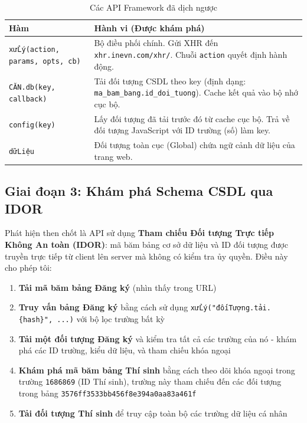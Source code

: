 \documentclass[12pt,a4paper]{article}
\begin{document}
\begin{table}[H]
\centering
\caption{Các API Framework đã dịch ngược}
\begin{tabular}{@{}lp{9cm}@{}}
\toprule
\textbf{Hàm} & \textbf{Hành vi (Được khám phá)} \\
\midrule
\texttt{xửLý(action, params, opts, cb)} &
    Bộ điều phối chính. Gửi XHR đến \texttt{xhr.inevn.com/xhr/}. Chuỗi \texttt{action} quyết định hành động. \\
\texttt{CĂN.db(key, callback)} &
    Tải đối tượng CSDL theo key (định dạng: \texttt{ma\_bam\_bang.id\_doi\_tuong}). Cache kết quả vào bộ nhớ cục bộ. \\
\texttt{config(key)} &
    Lấy đối tượng đã tải trước đó từ cache cục bộ. Trả về đối tượng JavaScript với ID trường (số) làm key. \\
\texttt{dữLiệu} &
    Đối tượng toàn cục (Global) chứa ngữ cảnh dữ liệu của trang web. \\
\bottomrule
\end{tabular}
\end{table}

\subsection{Giai đoạn 3: Khám phá Schema CSDL qua IDOR}

Phát hiện then chốt là API sử dụng \textbf{Tham chiếu Đối tượng Trực tiếp Không An toàn (IDOR)}: mã băm bảng cơ sở dữ liệu và ID đối tượng được truyền trực tiếp từ client lên server mà không có kiểm tra ủy quyền. Điều này cho phép tôi:

\begin{enumerate}
    \item \textbf{Tải mã băm bảng Đăng ký} (nhìn thấy trong URL)
    \item \textbf{Truy vấn bảng Đăng ký} bằng cách sử dụng \texttt{xửLý("đốiTượng.tải.\{hash\}", ...)} với bộ lọc trường bất kỳ
    \item \textbf{Tải một đối tượng Đăng ký} và kiểm tra tất cả các trường của nó - khám phá các ID trường, kiểu dữ liệu, và tham chiếu khóa ngoại
    \item \textbf{Khám phá mã băm bảng Thí sinh} bằng cách theo dõi khóa ngoại trong trường \texttt{1686869} (ID Thí sinh), trường này tham chiếu đến các đối tượng trong bảng \texttt{3576ff3533bb456f8e394a0aa83a461f}
    \item \textbf{Tải đối tượng Thí sinh} để truy cập toàn bộ các trường dữ liệu cá nhân
\end{enumerate}
\end{document}
